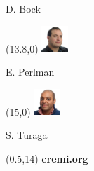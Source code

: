 \documentclass[aspectratio=169]{beamer}
\begin{document}
\begin{frame}
\begin{textblock}{3}
        D. Bock%
    \end{textblock}%
    
    \begin{textblock}{3}(13.8,0)
        \tiny\includegraphics[width=1cm]{fig/people/perlman.jpeg}
        
        E. Perlman%
    \end{textblock}%
    
    \begin{textblock}{3}(15,0)
        \tiny\includegraphics[width=1cm]{fig/people/turaga.jpg}
        
        S. Turaga%
    \end{textblock}%
    
    \begin{textblock}{3}(0.5,14)
        {\color{white}\Huge\bf cremi.org}
    \end{textblock}
\end{frame}
\end{document}
